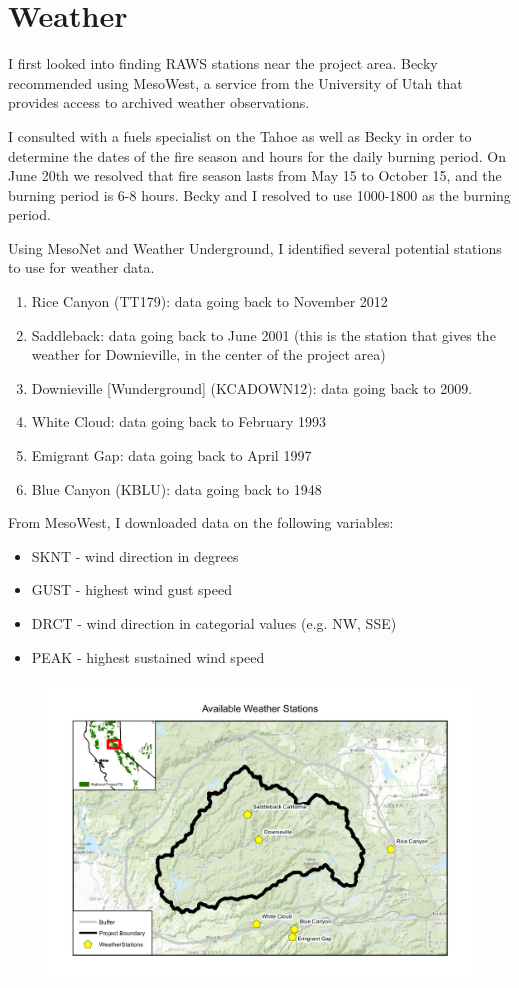 \section{Weather}
I first looked into finding RAWS stations near the project area. Becky recommended using MesoWest, a service from the University of Utah that provides access to archived weather observations.

I consulted with a fuels specialist on the Tahoe as well as Becky in order to determine the dates of the fire season and hours for the daily burning period. On June 20th we resolved that fire season lasts from May 15 to October 15, and the burning period is 6-8 hours. Becky and I resolved to use 1000-1800 as the burning period.

Using MesoNet and Weather Underground, I identified several potential stations to use for weather data.
\begin{enumerate}
\item Rice Canyon (TT179): data going back to November 2012 
\item Saddleback: data going back to June 2001 (this is the station that gives the weather for Downieville, in the center of the project area)
\item Downieville [Wunderground] (KCADOWN12): data going back to 2009.
\item White Cloud: data going back to February 1993
\item Emigrant Gap: data going back to April 1997
\item Blue Canyon (KBLU): data going back to 1948
\end{enumerate}

From MesoWest, I downloaded data on the following variables:
\begin{itemize}
\item SKNT - wind direction in degrees
\item GUST - highest wind gust speed
\item DRCT - wind direction in categorial values (e.g. NW, SSE)
\item PEAK - highest sustained wind speed
\end{itemize}

\begin{figure}[h!]
\centering
\includegraphics[width=\textwidth]{WeatherStationMap}
\end{figure}

